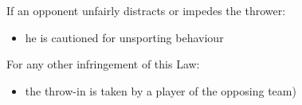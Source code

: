 {{\bigskip

If an opponent unfairly distracts or impedes the thrower:

\begin{itemize}
\item he is cautioned for unsporting behaviour
\end{itemize}

\bigskip

For any other infringement of this Law:

\begin{itemize}
\item the throw-in is taken by a player of the opposing team)
\end{itemize}
}
}